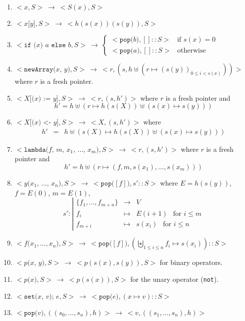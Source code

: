 \documentclass[12pt,a4paper]{article}
\newcommand{\cl}[1]{\texttt{#1}}
\begin{document}
\begin{enumerate}
\itemsep-0.2em
\item $<x,S> \ \longrightarrow \ < S(x), S> $
\item $<x \cl{[} y \cl{]} , S> \ \longrightarrow \ < h(s(x))(s(y)) , S>$
\item $<\cl{if (} x \cl{) } a \cl{ else } b, S>  \ \longrightarrow \ 
\left\lbrace \begin{array}{ll}
< \cl{pop(}b\cl{)} , [] :: S > & \text{if } s(x) = 0 \\
< \cl{pop(}a\cl{)} , [] :: S > & \text{otherwise}
\end{array} \right. $
\item $<\cl{newArray(} x \cl{, } y \cl{)} , S > \ \longrightarrow \ <r, \left(s, h \uplus \left( r \mapsto (s(y))_{0 \leq i < s(x)} \right) \right) >$ where $r$ is a fresh pointer.
\item $< X \cl{[(} x \cl{) := } y \cl{]} , S> \ \longrightarrow \ < r, (s, h') >$ where $r$ is a fresh pointer and
$$ h' = h \uplus \left( r \mapsto h( s(X) ) \uplus \left( s(x) \mapsto s(y) \right) \right) $$
\item $< X \cl{[(} x \cl{) <- } y \cl{]} , S> \ \longrightarrow \ < X, (s, h') >$ where
\begin{eqnarray*}
h' &=& h \uplus \left( s(X) \mapsto h( s(X) ) \uplus \left( s(x) \mapsto s(y) \right) \right)
\end{eqnarray*}
\item $< \cl{lambda(} f \cl{, } m \cl{, } x_1 \cl{, } ... \cl{, } x_m \cl{)} , S > \ \longrightarrow \ < r, (s, h') > $ where $r$ is a fresh pointer and
$$h' = h \uplus ( r \mapsto (f, m, s(x_1), ... , s(x_m) ) ) $$
\item $< y\cl{(} x_1 \cl{, } ... \cl{, } x_n \cl{)}, S> \ \longrightarrow \ < \cl{pop(} [f] \cl{)}, s' :: S>$ where $E = h(s(y))$, $f=E(0)$, $m=E(1)$,
$$ s' : \left| \begin{array}{ccl}
\{ f_1, ... , f_{m+n} \} & \rightarrow & V \\
f_i & \mapsto & E(i+1) \ \ \text{ for } i \leq m \\
f_{m+i} & \mapsto & s(x_i) \ \ \text{ for } i \leq n
\end{array} \right. $$
\item $<f\cl{(} x_1, ... , x_n \cl{)} , S> \ \longrightarrow \ < \cl{pop(} [f] \cl{)}, \left( \biguplus_{1 \leq i \leq n} f_i \mapsto s(x_i) \right) :: S > $
\item $< p\cl{(} x \cl{, } y \cl{)}, S> \ \longrightarrow \ < p( s(x) , s(y) ), S>$ for binary operators.
\item $< p\cl{(} x \cl{)}, S> \ \longrightarrow \ < p( s(x) ), S >$ for the unary operator (\cl{not}).
\item $<\cl{set(} x \cl{, } v \cl{); } e, S> \ \longrightarrow \ < \cl{pop(}e\cl{)}, (x \mapsto v) :: S> $
\item $<\cl{pop(} v \cl{)}, ( (s_0, ... , s_n), h) > \ \longrightarrow \ <v, ( (s_1, ... , s_n), h) > $
\end{enumerate}
\end{document}
